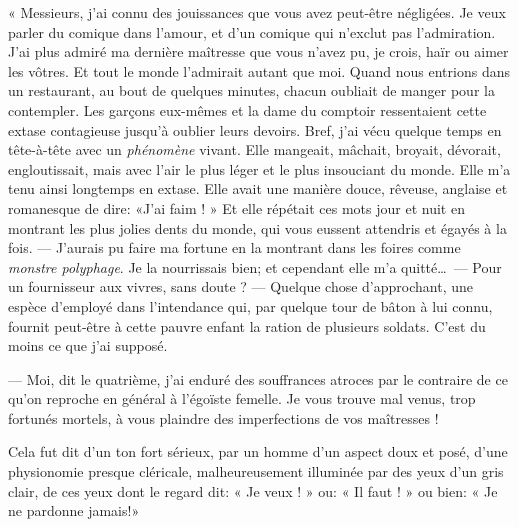 « Messieurs, j’ai connu des jouissances que vous avez
peut{}-être négligées. Je veux parler du comique dans
l’amour, et d’un comique qui
n’exclut pas l’admiration.
J’ai plus admiré ma dernière maîtresse que vous
n’avez pu, je crois, haïr ou aimer les vôtres. Et tout
le monde l’admirait autant que moi. Quand nous
entrions dans un restaurant, au bout de quelques minutes, chacun
oubliait de manger pour la contempler. Les garçons eux{}-mêmes et la
dame du comptoir ressentaient cette extase contagieuse
jusqu’à oublier leurs devoirs. Bref,
j’ai vécu quelque temps en tête{}-à{}-tête avec un
\textit{phénomène} vivant. Elle mangeait, mâchait, broyait, dévorait,
engloutissait, mais avec l’air le plus léger et le
plus insouciant du monde. Elle m’a tenu ainsi
longtemps en extase. Elle avait une manière douce, rêveuse, anglaise et
romanesque de dire: «J’ai faim ! » Et elle répétait
ces mots jour et nuit en montrant les plus jolies dents du monde, qui
vous eussent attendris et égayés à la fois. --- J’aurais
pu faire ma fortune en la montrant dans les foires comme \textit{monstre
polyphage}. Je la nourrissais bien; et cependant elle
m’a quitté\ldots\ --- Pour un fournisseur aux vivres, sans
doute ? --- Quelque chose d’approchant, une espèce
d’employé dans l’intendance qui, par
quelque tour de bâton à lui connu, fournit peut{}-être à cette pauvre
enfant la ration de plusieurs soldats. C’est du moins
ce que j’ai supposé.

--- Moi, dit le quatrième, j’ai enduré des souffrances
atroces par le contraire de ce qu’on reproche en
général à l’égoïste femelle. Je vous trouve mal venus,
trop fortunés mortels, à vous plaindre des imperfections de vos
maîtresses !

Cela fut dit d’un ton fort sérieux, par un homme
d’un aspect doux et posé, d’une
physionomie presque cléricale, malheureusement illuminée par des yeux
d’un gris clair, de ces yeux dont le regard dit: « Je
veux ! » ou: « Il faut ! » ou bien: « Je ne pardonne jamais!»

